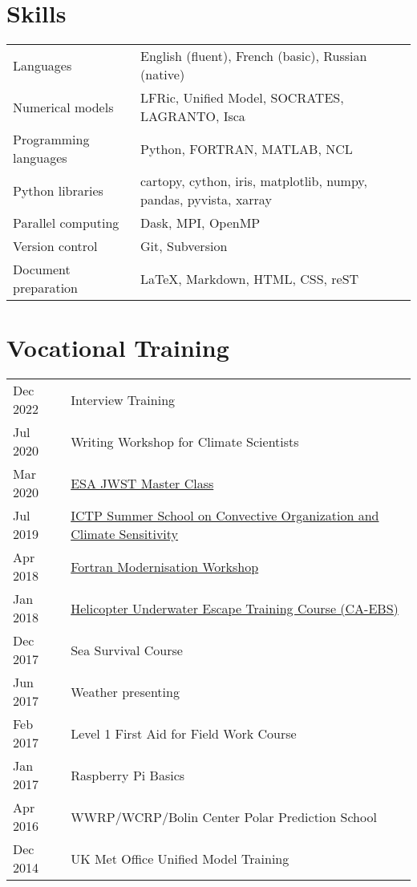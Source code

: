 \documentclass[a4paper, 11pt]{article}
\begin{document}
\section{Skills}
\begin{tabularx}{\linewidth}{@{}l X@{}}
Languages & English (fluent), French (basic), Russian (native) \\
Numerical models &  LFRic, Unified Model, SOCRATES, LAGRANTO, Isca \\
Programming languages &  Python, FORTRAN, MATLAB, NCL \\
Python libraries & cartopy, cython, iris, matplotlib, numpy, pandas, pyvista, xarray \\
Parallel computing & Dask, MPI, OpenMP \\
Version control & Git, Subversion \\
Document preparation & \LaTeX, Markdown, HTML, CSS, reST
\end{tabularx}

\section{Vocational Training}
\begin{tabularx}{\linewidth}{@{}l X@{}}
Dec 2022 & Interview Training \\
Jul 2020 & Writing Workshop for Climate Scientists \\
Mar 2020 & \href{https://ers-imaging.github.io/uk_workshop}{ESA JWST Master Class} \\
Jul 2019 & \href{https://indico.ictp.it/event/8669}{ICTP Summer School on Convective Organization and Climate Sensitivity} \\
Apr 2018 & \href{https://www.nag.com/content/fortran-modernization-workshop}{Fortran Modernisation Workshop} \\
Jan 2018 & \href{http://www.petans.co.uk/courses/survival/huet-caebs/}{Helicopter Underwater Escape Training Course (CA-EBS)} \\
Dec 2017 & Sea Survival Course \\
Jun 2017 & Weather presenting \\
Feb 2017 & Level 1 First Aid for Field Work Course \\
Jan 2017 & Raspberry Pi Basics \\
Apr 2016 & WWRP/WCRP/Bolin Center Polar Prediction School \\
Dec 2014 & UK Met Office Unified Model Training \\
\end{tabularx}
\end{document}
